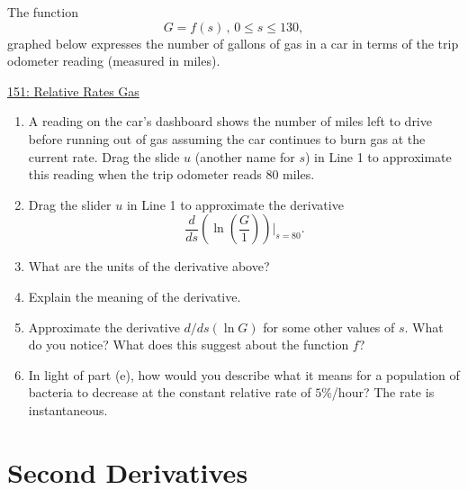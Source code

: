 \documentclass{ximera}
\begin{document}
\begin{question} \label{QPErerDR}
The function
\[
     G =f(s) \, , \, 0\leq s \leq 130 ,
\]
graphed below expresses the number of gallons of gas in a car in terms of the trip odometer reading (measured in miles).


\begin{onlineOnly}
    \begin{center}
\end{center}
\end{onlineOnly}

\href{https://www.desmos.com/calculator/gdeybih5t2}{151: Relative Rates Gas}

\begin{enumerate}

\item A reading on the car's dashboard shows the number of miles left to drive before running out of gas assuming the car continues to burn gas at the current rate. Drag the slide $u$ (another name for $s$) in Line 1 to approximate this reading when the trip odometer reads $80$ miles.

\item Drag the slider $u$ in Line 1 to approximate the derivative 
\[
     \frac{d}{ds} \left(   \ln \left(\frac{G}{1}\right)  \right)\Big|_{s=80}.
\] 

\item What are the units of the derivative above?

\item Explain the meaning of the derivative.

\item Approximate the derivative $d/ds (\ln G)$ for some other values of $s$. What do you notice? What does this suggest about the function $f$?

\item In light of part (e), how would you describe what it means for a population of bacteria to decrease at the constant relative rate of $5\%$/hour? The rate is instantaneous.
\end{enumerate}

\end{question}




\section{Second Derivatives}
\end{document}
